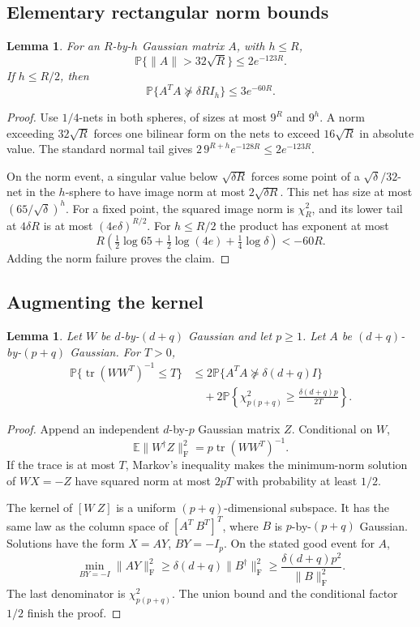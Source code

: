 \documentclass[11pt]{article}
\newtheorem{lemma}[theorem]{Lemma}
\theoremstyle{remark}\newtheorem{remark}[theorem]{Remark}
\newcommand{\E}{\mathbb E}
\newcommand{\Prb}{\mathbb P}
\newcommand{\tr}{\operatorname{tr}}
\newcommand{\F}{\mathrm F}
\begin{document}
\subsection{Elementary rectangular norm bounds}
\begin{lemma}\label{le:nets}
For an $R$-by-$h$ Gaussian matrix $A$, with $h\le R$,
\[
 \Prb\{\|A\|>32\sqrt R\}\le2e^{-123R}.
\]
If $h\le R/2$, then
\[
 \Prb\{A^TA\not\succeq\delta R I_h\}\le3e^{-60R}.
\]
\end{lemma}
\begin{proof}
Use $1/4$-nets in both spheres, of sizes at most $9^R$ and $9^h$. A norm exceeding $32\sqrt R$ forces one bilinear form on the nets to exceed $16\sqrt R$ in absolute value. The standard normal tail gives
$2\,9^{R+h}e^{-128R}\le2e^{-123R}$.

On the norm event, a singular value below $\sqrt{\delta R}$ forces some point of a $\sqrt\delta/32$-net in the $h$-sphere to have image norm at most $2\sqrt{\delta R}$. This net has size at most $(65/\sqrt\delta)^h$. For a fixed point, the squared image norm is $\chi_R^2$, and its lower tail at $4\delta R$ is at most $(4e\delta)^{R/2}$. For $h\le R/2$ the product has exponent at most
\[
 R\left(\tfrac12\log65+\tfrac12\log(4e)+\tfrac14\log\delta\right)<-60R.
\]
Adding the norm failure proves the claim.
\end{proof}

\subsection{Augmenting the kernel}
\begin{lemma}\label{le:augmentation}
Let $W$ be $d$-by-$(d+q)$ Gaussian and let $p\ge1$. Let $A$ be $(d+q)$-by-$(p+q)$ Gaussian. For $T>0$,
\begin{align*}
 \Prb\{\tr(WW^T)^{-1}\le T\}
 &\le2\Prb\{A^TA\not\succeq\delta(d+q)I\}\\
 &\quad+2\Prb\left\{\chi^2_{p(p+q)}\ge\frac{\delta(d+q)p}{2T}\right\}.
\end{align*}
\end{lemma}
\begin{proof}
Append an independent $d$-by-$p$ Gaussian matrix $Z$. Conditional on $W$,
\[
 \E\|W^\dagger Z\|_\F^2=p\tr(WW^T)^{-1}.
\]
If the trace is at most $T$, Markov's inequality makes the minimum-norm solution of $WX=-Z$ have squared norm at most $2pT$ with probability at least $1/2$.

The kernel of $[W\ Z]$ is a uniform $(p+q)$-dimensional subspace. It has the same law as the column space of $[A^T\ B^T]^T$, where $B$ is $p$-by-$(p+q)$ Gaussian. Solutions have the form $X=AY$, $BY=-I_p$. On the stated good event for $A$,
\[
 \min_{BY=-I}\|AY\|_\F^2
 \ge\delta(d+q)\|B^\dagger\|_\F^2
 \ge\frac{\delta(d+q)p^2}{\|B\|_\F^2}.
\]
The last denominator is $\chi^2_{p(p+q)}$. The union bound and the conditional factor $1/2$ finish the proof.
\end{proof}
\end{document}
